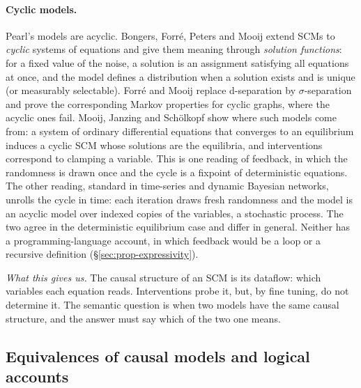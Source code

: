 \paragraph{Cyclic models.} Pearl's models are acyclic. Bongers, Forré, Peters and Mooij \cite{Bongers_2021} extend SCMs to \emph{cyclic} systems of equations and give them meaning through \emph{solution functions}: for a fixed value of the noise, a solution is an assignment satisfying all equations at once, and the model defines a distribution when a solution exists and is unique (or measurably selectable). Forré and Mooij \cite{forre2017markov} replace d-separation by $\sigma$-separation and prove the corresponding Markov properties for cyclic graphs, where the acyclic ones fail. Mooij, Janzing and Schölkopf \cite{mooij2013ode} show where such models come from: a system of ordinary differential equations that converges to an equilibrium induces a cyclic SCM whose solutions are the equilibria, and interventions correspond to clamping a variable. This is one reading of feedback, in which the randomness is drawn once and the cycle is a fixpoint of deterministic equations. The other reading, standard in time-series and dynamic Bayesian networks, unrolls the cycle in time: each iteration draws fresh randomness and the model is an acyclic model over indexed copies of the variables, a stochastic process. The two agree in the deterministic equilibrium case and differ in general. Neither has a programming-language account, in which feedback would be a loop or a recursive definition (\S\ref{sec:prop-expressivity}).

\emph{What this gives us.} The causal structure of an SCM is its dataflow: which variables each equation reads. Interventions probe it, but, by fine tuning, do not determine it. The semantic question is when two models have the same causal structure, and the answer must say which of the two one means.

\subsection{Equivalences of causal models and logical accounts}


